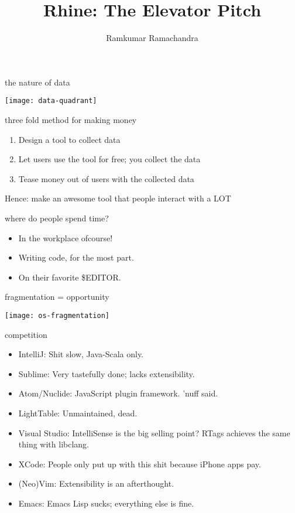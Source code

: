 \documentclass{beamer}
\title{Rhine: The Elevator Pitch}
\author{Ramkumar Ramachandra}
\institute{[TBA]}
\begin{document}
\begin{frame}{the nature of data}
  \begin{center}\texttt{[image: data-quadrant]}\end{center}
\end{frame}

\begin{frame}{three fold method for making money}
  \begin{enumerate}
  \item Design a tool to collect data
  \item Let users use the tool for free; you collect the data
  \item Tease money out of users with the collected data
  \end{enumerate}
  \vspace{2cm}
  \footnotesize{Hence: make an awesome tool that people interact with a LOT}
\end{frame}

\begin{frame}{where do people spend time?}
  \begin{itemize}
  \item In the workplace ofcourse!
  \item Writing code, for the most part.
  \item On their favorite \$EDITOR.
  \end{itemize}
\end{frame}


\begin{frame}{fragmentation = opportunity}
  \begin{center}\texttt{[image: os-fragmentation]}\end{center}
\end{frame}

\begin{frame}{competition}
  \begin{itemize}
  \item IntelliJ: Shit slow, Java-Scala only.
  \item Sublime: Very tastefully done; lacks extensibility.
  \item Atom/Nuclide: JavaScript plugin framework. 'nuff said.
  \item LightTable: Unmaintained, dead.
  \item Visual Studio: IntelliSense is the big selling point? RTags
    achieves the same thing with libclang.
  \item XCode: People only put up with this shit because iPhone apps
    pay.
  \item (Neo)Vim: Extensibility is an afterthought.
  \item Emacs: Emacs Lisp sucks; everything else is fine.
  \end{itemize}
\end{frame}
\end{document}
